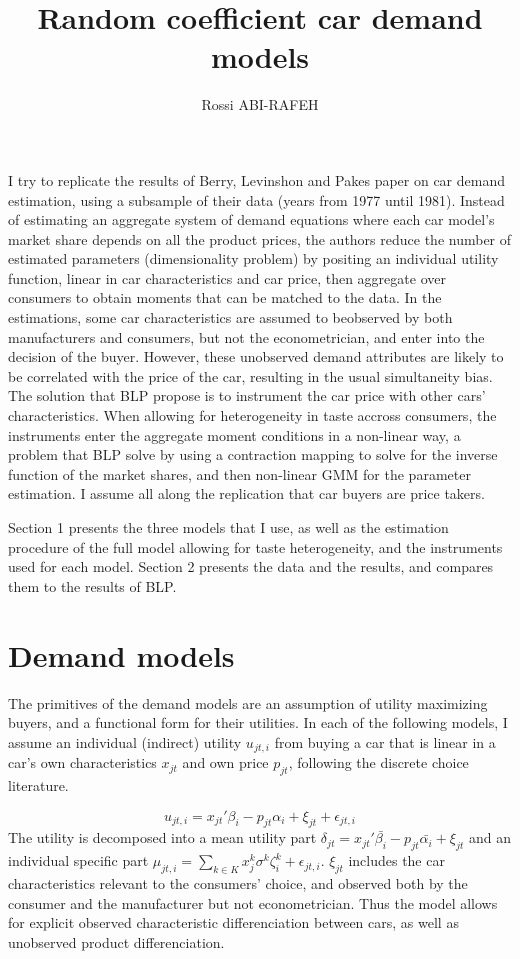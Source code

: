 \documentclass{article}\usepackage[]{graphicx}\usepackage[]{color}
\title{Random coefficient car demand models}
\author{Rossi ABI-RAFEH}
\begin{document}
\maketitle

I try to replicate the results of Berry, Levinshon and Pakes paper on car demand estimation, using a subsample of their data (years from 1977 until 1981). Instead of estimating an aggregate system of demand equations where each car model's market share depends on all the product prices, the authors reduce the number of estimated parameters (dimensionality problem) by positing an individual utility function, linear in car characteristics and car price, then aggregate over consumers to obtain moments that can be matched to the data. In the estimations, some car characteristics are assumed to beobserved by both manufacturers and consumers, but not the econometrician, and enter into the decision of the buyer. However, these unobserved demand attributes are likely to be correlated with the price of the car, resulting in the usual simultaneity bias. The solution that BLP propose is to instrument the car price with other cars' characteristics. When allowing for heterogeneity in taste accross consumers, the instruments enter the aggregate moment conditions in a non-linear way, a problem that BLP solve by using a contraction mapping to solve for the inverse function of the market shares, and then non-linear GMM for the parameter estimation. I assume all along the replication that car buyers are price takers. 

Section 1 presents the three models that I use, as well as the estimation procedure of the full model allowing for taste heterogeneity, and the instruments used for each model. Section 2 presents the data and the results, and compares them to the results of BLP.
%

%


\section{Demand models}

The primitives of the demand models are an assumption of utility maximizing buyers, and a functional form for their utilities. In each of the following models, I assume an individual (indirect) utility $u_{jt,i}$ from buying a car that is linear in a car's own characteristics $x_{jt}$ and own price $p_{jt}$, following the discrete choice literature. 

\begin{equation}
u_{jt,i} = x_{jt}' \beta_i - p_{jt} \alpha_i + \xi_{jt} + \epsilon_{jt,i}
\label{eq:gen_utility}
\end{equation}
 The utility is decomposed into a mean utility part $\delta_{jt} = x_{jt}' \bar{\beta_i} - p_{jt} \bar{\alpha_i} + \xi_{jt}$ and an individual specific part $\mu_{jt,i} = \sum\limits_{k \in K} x_j^k \sigma^k \zeta^k_i + \epsilon_{jt,i}$. $\xi_{jt}$ includes the car characteristics relevant to the consumers' choice, and observed both by the consumer and the manufacturer but not econometrician. Thus the model allows for explicit observed characteristic differenciation between cars, as well as unobserved product differenciation. 
 
\end{document}
